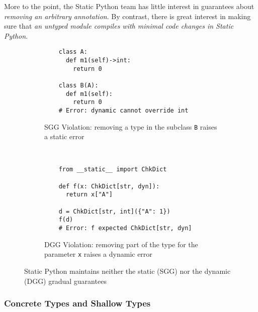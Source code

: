 \documentclass[english,cleveref,submission]{programming}
\newcommand{\SP}{Static Python}
\newcommand{\code}[1]{\texttt{#1}}
\begin{document}
More to the point, the \SP{} team has little interest in guarantees about
\emph{removing an arbitrary annotation}.
By contrast, there is great interest in making sure that \emph{an untyped
module compiles with minimal code changes in \SP{}}.

\begin{figure}
  \begin{subfigure}[t]{0.5\columnwidth}
  \begin{verbatim}
    class A:
      def m1(self)->int:
        return 0

    class B(A):
      def m1(self):
        return 0
    # Error: dynamic cannot override int
  \end{verbatim}
    \caption{SGG Violation: removing a type in the subclass \code{B} raises a static error}
    \label{f:gg-failure-stat}
  \end{subfigure}
  ~
  \begin{subfigure}[t]{0.5\columnwidth}
  \begin{verbatim}
    from __static__ import ChkDict

    def f(x: ChkDict[str, dyn]):
      return x["A"]

    d = ChkDict[str, int]({"A": 1})
    f(d)
    # Error: f expected ChkDict[str, dyn]
  \end{verbatim}
    \caption{DGG Violation: removing part of the type for the parameter \code{x} raises a dynamic error}
    \label{f:gg-failure-dyn}
  \end{subfigure}
  \caption{\SP{} maintains neither the static (SGG) nor the dynamic (DGG) gradual guarantees}
  \label{fig:gg-failure}
\end{figure}



\subsubsection{Concrete Types and Shallow Types}
\label{s:checked-type}
\end{document}
